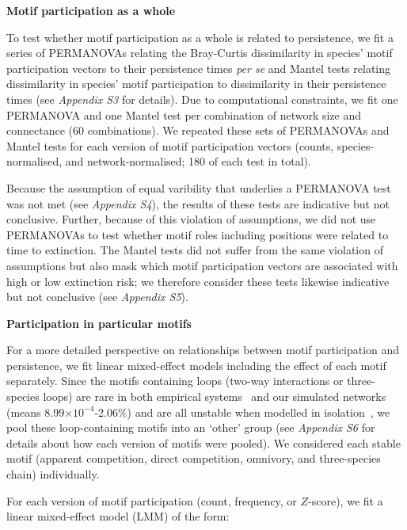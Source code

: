 \documentclass[12pt]{article}
\begin{document}
\begin{spacing}{1.0}
            \textbf{Motif participation as a whole}

                To test whether motif participation as a whole is related to persistence, we fit a series of PERMANOVAs relating the Bray-Curtis dissimilarity in species' motif participation vectors to their persistence times \emph{per se} and Mantel tests relating dissimilarity in species' motif participation to dissimilarity in their persistence times (see \emph{Appendix S3} for details). 
                Due to computational constraints, we fit one PERMANOVA and one Mantel test per combination of network size and connectance (60 combinations). 
                We repeated these sets of PERMANOVAs and Mantel tests for each version of motif participation vectors (counts, species-normalised, and network-normalised; 180 of each test in total).
                
                
                Because the assumption of equal varibility that underlies a PERMANOVA test was not met (see \emph{Appendix S4}), the results of these tests are indicative but not conclusive.
                Further, because of this violation of assumptions, we did not use PERMANOVAs to test whether motif roles including positions were related to time to extinction.
                The Mantel tests did not suffer from the same violation of assumptions but also mask which motif participation vectors are associated with high or low extinction risk; we therefore consider these tests likewise indicative but not conclusive (see \emph{Appendix S5}).


            \textbf{Participation in particular motifs}

                For a more detailed perspective on relationships between motif participation and persistence, we fit linear mixed-effect models including the effect of each motif separately.
                Since the motifs containing loops (two-way interactions or three-species loops) are rare in both empirical systems~\citep{Stouffer2007} and our simulated networks (means 8.99$\times10^{-4}$-2.06\%) and are all unstable when modelled in isolation~\citep{Borrelli2015a}, we pool these loop-containing motifs into an `other' group (see \emph{Appendix S6} for details about how each version of motifs were pooled). 
                We considered each stable motif (apparent competition, direct competition, omnivory, and three-species chain) individually.


                For each version of motif participation (count, frequency, or $Z$-score), we fit a  linear mixed-effect model (LMM) of the form:


\end{spacing}
\end{document}
